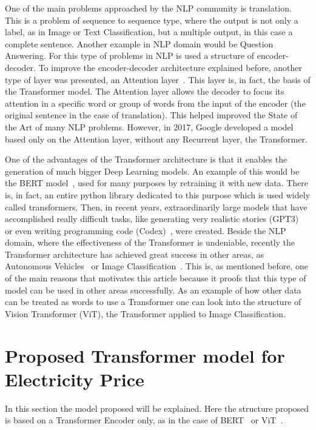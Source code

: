 \documentclass[journal]{IEEEtran}
\begin{document}
One of the main problems approached by the NLP community is translation.
This is a problem of sequence to sequence type, where the output is not only a label, as in Image or Text Classification, but a multiple output, in this case a complete sentence. Another example in NLP domain would be Question Answering. For this type of problems in NLP is used a structure of encoder-decoder. To improve the encoder-decoder architecture explained before, another type of layer was presented, an Attention layer~\cite{bahdanauNeuralMachineTranslation2016}. This layer is, in fact, the basis of the Transformer model. The Attention layer allows the decoder to focus its attention in a specific word or group of words from the input of the encoder (the original sentence in the case of translation). This helped improved the State of the Art of many NLP problems. However, in 2017, Google developed a model based only on the Attention layer, without any Recurrent layer, the Transformer.

One of the advantages of the Transformer architecture is that it enables the generation of much bigger Deep Learning models. An example of this would be the BERT model~\cite{chenEvaluatingLargeLanguage2021}, used for many purposes by retraining it with new data. There
is, in fact, an entire python library dedicated to this purpose which is used widely
called transformers. Then, in recent years, extraordinarily large models that have
accomplished really difficult tasks, like generating very realistic stories (GPT3)~\cite{brownLanguageModelsAre2020}
or even writing programming code (Codex)~\cite{chenEvaluatingLargeLanguage2021}, were created.
Beside the NLP domain, where the effectiveness of the Transformer is undeniable, recently the Transformer architecture has achieved great success in other areas, as Autonomous Vehicles~\cite{teslaTeslaAIDay2021} or Image Classification~\cite{dosovitskiyImageWorth16x162022}. This is, as mentioned before, one of the main reasons that motivates this article because it proofs
that this type of model can be used in other areas successfully. As an example of how other data can be treated as words to use a Transformer one can look into the structure of Vision Transformer (ViT), the Transformer applied to Image Classification.

\section{Proposed Transformer model for Electricity Price}
In this section the model proposed will be explained. Here the structure proposed is based on a Transformer Encoder only, as in the case of BERT~\cite{devlinBERTPretrainingDeep2019} or ViT~\cite{dosovitskiyImageWorth16x162022}. 
\end{document}
